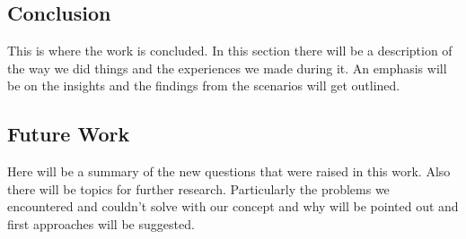 \subsection{Conclusion}
This is where the work is concluded. In this section there will be a description of the way we did things and the experiences we made during it. An emphasis will be on the insights and the findings from the scenarios will get outlined.

\subsection{Future Work}
Here will be a summary of the new questions that were raised in this work. Also there will be topics for further research. Particularly the problems we encountered and couldn't solve with our concept and why will be pointed out and first approaches will be suggested.